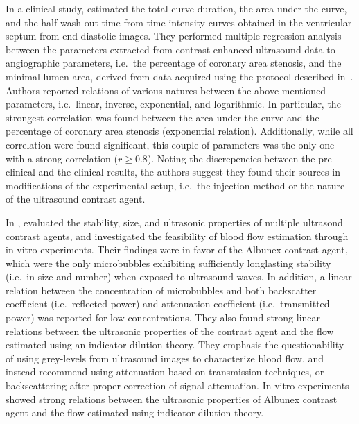 In a clinical study, \citet{TenCate:1987vw} estimated the total curve duration, the area under the curve, and the half wash-out time from time-intensity curves obtained in the ventricular septum from end-diastolic images.
They performed multiple regression analysis between the parameters extracted from contrast-enhanced ultrasound data to angiographic parameters, i.e.~the percentage of coronary area stenosis, and the minimal lumen area, derived from data acquired using the protocol described in~\cite{Wijns:1985wz}.
Authors reported relations of various natures between the above-mentioned parameters, i.e.~linear, inverse, exponential, and logarithmic.
In particular, the strongest correlation was found between the area under the curve and the percentage of coronary area stenosis (exponential relation). 
Additionally, while all correlation were found significant, this couple of parameters was the only one with a strong correlation ($r \geq 0.8$). 
Noting the discrepencies between the pre-clinical and the clinical results, the authors suggest they found their sources in modifications of the experimental setup, i.e.~the injection method or the nature of the ultrasound contrast agent.

In \citeyear{Bleeker:1990uy}, \citet{Bleeker:1990uy} evaluated the stability, size, and ultrasonic properties of multiple ultrasond contrast agents, and investigated the feasibility of blood flow estimation through in vitro experiments.
Their findings were in favor of the Albunex contrast agent, which were the only microbubbles exhibiting sufficiently longlasting stability (i.e.~in size and number) when exposed to ultrasound waves.
In addition, a linear relation between the concentration of microbubbles and both backscatter coefficient (i.e.~reflected power) and attenuation coefficient (i.e.~transmitted power) was reported for low concentrations.
They also found strong linear relations between the ultrasonic properties of the contrast agent and the flow estimated using an indicator-dilution theory.  
They emphasis the questionability of using grey-levels from ultrasound images to characterize blood flow, and instead recommend using attenuation based on transmission techniques, or backscattering after proper correction of signal attenuation.
In vitro experiments showed strong relations between the ultrasonic properties of Albunex contrast agent and the flow estimated using indicator-dilution theory.

